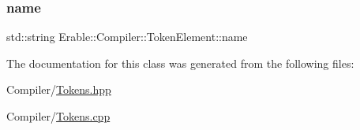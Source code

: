 \subsubsection{\texorpdfstring{name}{name}}
{\footnotesize\ttfamily std\+::string Erable\+::\+Compiler\+::\+Token\+Element\+::name\hspace{0.3cm}{\ttfamily [protected]}}



The documentation for this class was generated from the following files\+:\begin{DoxyCompactItemize}
\item 
Compiler/\mbox{\hyperlink{_tokens_8hpp}{Tokens.\+hpp}}\item 
Compiler/\mbox{\hyperlink{_tokens_8cpp}{Tokens.\+cpp}}\end{DoxyCompactItemize}
